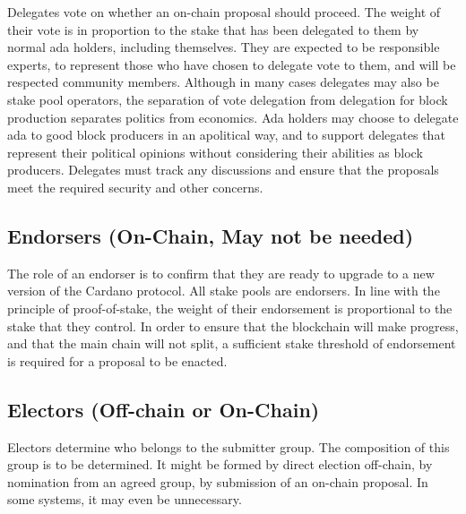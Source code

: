 Delegates vote on whether an on-chain proposal should proceed.  The weight of
their vote is in proportion to the stake that has been delegated to them by
normal ada holders, including themselves.  They are expected to be responsible
experts, to represent those who have chosen to delegate vote to them, and will
be respected community members.  Although in many cases delegates may also be
stake pool operators, the separation of vote delegation from delegation for
block production separates politics from economics.  Ada holders may choose to
delegate ada to good block producers in an apolitical way, and to support
delegates that represent their political opinions without considering their abilities as
block producers.  Delegates must track any discussions and ensure that the proposals meet the required
security and other concerns.

\subsection{Endorsers (On-Chain, May not be needed)}

The role of an endorser is to confirm that they are ready to upgrade to a new
version of the Cardano protocol.  All stake pools are endorsers.  In line with
the principle of proof-of-stake, the weight of their endorsement is proportional
to the stake that they control.  In order to ensure that the blockchain will
make progress, and that the main chain will not split, a sufficient stake
threshold of endorsement is required for a proposal to be enacted.

\subsection{Electors (Off-chain or On-Chain)}

Electors determine who belongs to the submitter group.  The composition of this group is to be determined.  It might be formed by direct election off-chain, by
nomination from an agreed group, by submission of an on-chain proposal.  In some systems, it may even be unnecessary.
